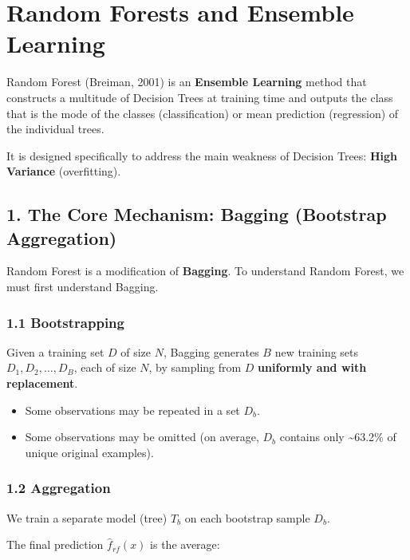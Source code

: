 \documentclass[
  italian,
  11pt,
]{article}
\begin{document}
\section{Random Forests and Ensemble
Learning}\label{random-forests-and-ensemble-learning}

Random Forest (Breiman, 2001) is an \textbf{Ensemble Learning} method
that constructs a multitude of Decision Trees at training time and
outputs the class that is the mode of the classes (classification) or
mean prediction (regression) of the individual trees.

It is designed specifically to address the main weakness of Decision
Trees: \textbf{High Variance} (overfitting).

\subsection{1. The Core Mechanism: Bagging (Bootstrap
Aggregation)}\label{the-core-mechanism-bagging-bootstrap-aggregation}

Random Forest is a modification of \textbf{Bagging}. To understand
Random Forest, we must first understand Bagging.

\subsubsection{1.1 Bootstrapping}\label{bootstrapping}

Given a training set \(D\) of size \(N\), Bagging generates \(B\) new
training sets \(D_1, D_2, \dots, D_B\), each of size \(N\), by sampling
from \(D\) \textbf{uniformly and with replacement}.

\begin{itemize}
\item
  Some observations may be repeated in a set \(D_b\).
\item
  Some observations may be omitted (on average, \(D_b\) contains only
  \textasciitilde63.2\% of unique original examples).
\end{itemize}

\subsubsection{1.2 Aggregation}\label{aggregation}

We train a separate model (tree) \(T_b\) on each bootstrap sample
\(D_b\).

The final prediction \(\hat{f}_{rf}(x)\) is the average:
\end{document}
